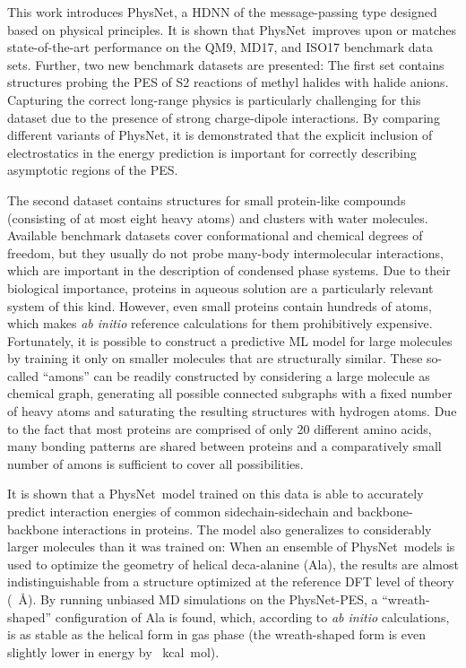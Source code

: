 \documentclass[12pt]{article}
\newcommand{\nn}{PhysNet}
\begin{document}
This work introduces \nn, a HDNN of the message-passing type designed
based on physical principles. It is shown that \nn\ improves upon or
matches state-of-the-art performance on the
QM9,\cite{ramakrishnan2014quantum} MD17,\cite{chmiela2017machine} and
ISO17\cite{schutt2017schnet} benchmark data sets. Further, two new
benchmark datasets are presented: The first set contains structures
probing the PES of S2 reactions of methyl halides with
halide anions. Capturing the correct long-range physics is
particularly challenging for this dataset due to the presence of
strong charge-dipole interactions. By comparing different variants of
\nn, it is demonstrated that the explicit inclusion of electrostatics
in the energy prediction is important for correctly describing
asymptotic regions of the PES.

The second dataset contains structures for small protein-like
compounds (consisting of at most eight heavy atoms) and clusters with
water molecules. Available benchmark datasets cover conformational and
chemical degrees of freedom, but they usually do not probe many-body
intermolecular interactions, which are important in the description of
condensed phase systems. Due to their biological importance, proteins
in aqueous solution are a particularly relevant system of this
kind. However, even small proteins contain hundreds of atoms, which
makes \textit{ab initio} reference calculations for them prohibitively
expensive. Fortunately, it is possible to construct a predictive ML
model for large molecules by training it only on smaller molecules
that are structurally similar.\cite{huang2017chemical} These so-called
``amons'' can be readily constructed by considering a large molecule
as chemical graph, generating all possible connected subgraphs with a
fixed number of heavy atoms and saturating the resulting structures
with hydrogen atoms.\cite{huang2017chemical} Due to the fact that most
proteins are comprised of only \num{20} different amino acids, many
bonding patterns are shared between proteins and a comparatively small
number of amons is sufficient to cover all possibilities.

It is shown that a \nn\ model trained on this data is able to
accurately predict interaction energies of common sidechain-sidechain
and backbone-backbone interactions in proteins. The model also
generalizes to considerably larger molecules than it was trained on:
When an ensemble\cite{breiman1996bagging} of \nn\ models is used to
optimize the geometry of helical deca-alanine (Ala), the
results are almost indistinguishable from a structure optimized at the
reference DFT level of theory (~\AA). By running
unbiased MD simulations on the \nn-PES, a ``wreath-shaped''
configuration of Ala is found, which, according to \textit{ab
  initio} calculations, is as stable as the helical form in gas phase
(the wreath-shaped form is even slightly lower in energy by
~kcal~mol).
\end{document}
